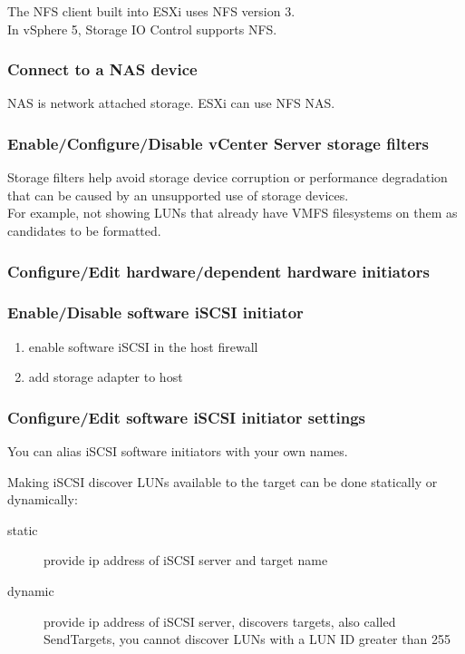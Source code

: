 The NFS client built into ESXi uses NFS version 3.\\

In vSphere 5, Storage IO Control supports NFS.

\subsubsection{Connect to a NAS device}

NAS is network attached storage. ESXi can use NFS NAS.

\subsubsection{Enable/Configure/Disable vCenter Server storage filters}

Storage filters help avoid storage device corruption or performance
degradation that can be caused by an unsupported use of storage devices.\\

For example, not showing LUNs that already have VMFS filesystems on them
as candidates to be formatted.

\subsubsection{Configure/Edit hardware/dependent hardware initiators}

\subsubsection{Enable/Disable software iSCSI initiator}

\begin{enumerate}
\item enable software iSCSI in the host firewall
\item add storage adapter to host
\end{enumerate}

\subsubsection{Configure/Edit software iSCSI initiator settings}

You can alias iSCSI software initiators with your own names.

Making iSCSI discover LUNs available to the target can be done statically
or dynamically:

\begin{description}

\item[static]
provide ip address of iSCSI server and target name

\item[dynamic]
provide ip address of iSCSI server, discovers targets, also called SendTargets,
you cannot discover LUNs with a LUN ID greater than 255

\end{description}

